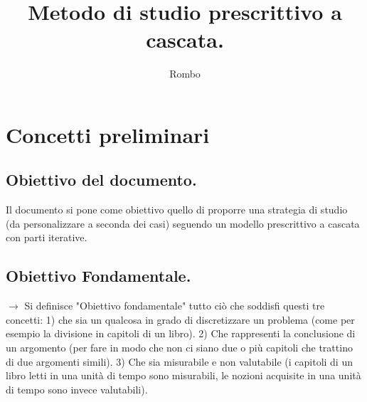 \documentclass[11pt,a4paper]{article}
\begin{document}
\title{Metodo di studio prescrittivo a cascata.}
\author{Rombo}
\maketitle
\newpage

\section{Concetti preliminari}
 \subsection{Obiettivo del documento. }
Il documento si pone come obiettivo quello di proporre una strategia di studio (da personalizzare a seconda dei casi) seguendo un modello prescrittivo a cascata con parti iterative.\\

\subsection{Obiettivo Fondamentale.}
$\rightarrow$ Si definisce "Obiettivo fondamentale" tutto ciò che soddisfi questi tre concetti: 1)  che sia un qualcosa in grado di discretizzare un problema (come per esempio la divisione in capitoli di un libro). 2) Che rappresenti la conclusione di un argomento (per fare in modo che non ci siano due o più capitoli che trattino di due argomenti simili). 3) Che sia misurabile e non valutabile (i capitoli di un libro letti in una unità di tempo sono misurabili, le nozioni acquisite in una unità di tempo sono invece valutabili).\\
\end{document}
